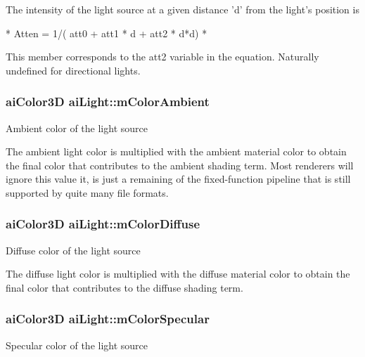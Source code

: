 The intensity of the light source at a given distance 'd' from the light's position is 
\begin{DoxyCode}
*  Atten = 1/( att0 + att1 * d + att2 * d*d)
*  
\end{DoxyCode}
 This member corresponds to the att2 variable in the equation. Naturally undefined for directional lights. \hypertarget{structai_light_a5188b60e6fbaf1635fa780913508e3cd}{
\subsubsection[{m\-Color\-Ambient}]{ {\bf ai\-Color3\-D} ai\-Light\-::m\-Color\-Ambient}}\label{structai_light_a5188b60e6fbaf1635fa780913508e3cd}
Ambient color of the light source

The ambient light color is multiplied with the ambient material color to obtain the final color that contributes to the ambient shading term. Most renderers will ignore this value it, is just a remaining of the fixed-\/function pipeline that is still supported by quite many file formats. \hypertarget{structai_light_a22e7feebbfaf53adf73bd9f581636efd}{
\subsubsection[{m\-Color\-Diffuse}]{ {\bf ai\-Color3\-D} ai\-Light\-::m\-Color\-Diffuse}}\label{structai_light_a22e7feebbfaf53adf73bd9f581636efd}
Diffuse color of the light source

The diffuse light color is multiplied with the diffuse material color to obtain the final color that contributes to the diffuse shading term. \hypertarget{structai_light_aa79ae6ad6a10f0cb9c740e23b6bb01bf}{
\subsubsection[{m\-Color\-Specular}]{ {\bf ai\-Color3\-D} ai\-Light\-::m\-Color\-Specular}}\label{structai_light_aa79ae6ad6a10f0cb9c740e23b6bb01bf}
Specular color of the light source

